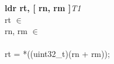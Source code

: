 


\begin{instructionblock}{\imagewidth}%
    \textbf{ldr rt, [ rn, rm ]}\hfill\textit{T1}\\
    rt $\in$ \baseplus\\
    rn, rm $\in$ \baseregisters\\
    {}\\
    rt = *((uint32\_t)(rn + rm));
\end{instructionblock}

